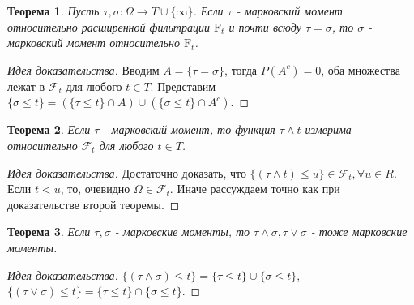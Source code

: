 \documentclass[16pt]{article}
\newtheorem{theorem}{Теорема}[section]
\theoremstyle{definition}
\begin{document}
\begin{theorem}
Пусть $\tau, \sigma: \Omega \rightarrow T \cup \{\infty\}$. Если $\tau$ - марковский момент относительно расширенной фильтрации $\mathrm{F}_t$ и почти всюду $\tau = \sigma$, то $\sigma$ - марковский момент относительно $\mathrm{F}_t$.
\end{theorem}
\begin{proof}[Идея доказательства]
Вводим $A = \{\tau = \sigma\}$, тогда $P(A^c) = 0$, оба множества лежат в $\mathcal{F}_t$ для любого $t \in T$. Представим $\{\sigma \le t\} = (\{\tau \le t\} \cap A) \cup (\{\sigma \le t\} \cap A^c)$.
\end{proof}
\begin{theorem}
Если $\tau$ - марковский момент, то функция $\tau \wedge t$ измерима относительно $\mathcal{F}_t$ для любого $t \in T$.
\end{theorem}
\begin{proof}[Идея доказательства]
Достаточно доказать, что $\{(\tau \wedge t) \le u\} \in \mathcal{F}_t, \forall u \in R$. Если $t < u$, то, очевидно $\Omega \in \mathcal{F}_t$. Иначе рассуждаем точно как при доказательстве второй теоремы.
\end{proof}
\begin{theorem}
Если $\tau, \sigma$ - марковские моменты, то $\tau \wedge \sigma, \tau \vee \sigma$ - тоже марковские моменты.
\end{theorem}
\begin{proof}[Идея доказательства]
$\{(\tau \wedge \sigma) \le t\} = \{\tau \le t\} \cup \{\sigma \le t\}$, $\{(\tau \vee \sigma) \le t\} = \{\tau \le t\} \cap \{\sigma \le t\}$.
\end{proof}
\end{document}
